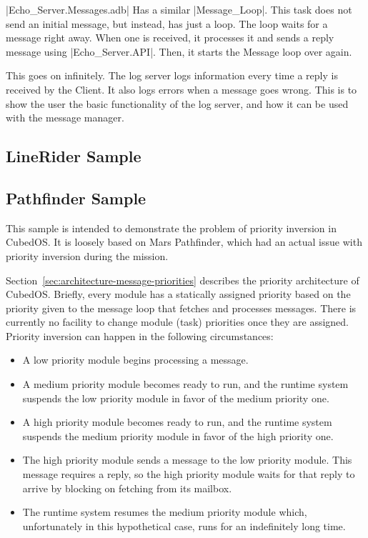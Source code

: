 |Echo_Server.Messages.adb| Has a similar |Message_Loop|. This task does not send an initial
message, but instead, has just a loop. The loop waits for a message right away. When one is
received, it processes it and sends a reply message using |Echo_Server.API|. Then, it starts the
Message loop over again.

This goes on infinitely. The log server logs information every time a reply is received by the
Client. It also logs errors when a message goes wrong. This is to show the user the basic
functionality of the log server, and how it can be used with the message manager.


\subsection{LineRider Sample}
\label{sec:manual-linerider-sample}



\subsection{Pathfinder Sample}
\label{sec:manual-pathfinder-sample}

This sample is intended to demonstrate the problem of priority inversion in CubedOS. It is
loosely based on Mars Pathfinder, which had an actual issue with priority inversion during the
mission.

Section~\ref{sec:architecture-message-priorities} describes the priority architecture of
CubedOS. Briefly, every module has a statically assigned priority based on the priority given to
the message loop that fetches and processes messages. There is currently no facility to change
module (task) priorities once they are assigned. Priority inversion can happen in the following
circumstances:

\begin{itemize}

\item A low priority module begins processing a message.

\item A medium priority module becomes ready to run, and the runtime system suspends the low
priority module in favor of the medium priority one.

\item A high priority module becomes ready to run, and the runtime system suspends the medium
priority module in favor of the high priority one.

\item The high priority module sends a message to the low priority module. This message requires
a reply, so the high priority module waits for that reply to arrive by blocking on fetching from
its mailbox.

\item The runtime system resumes the medium priority module which, unfortunately in this
hypothetical case, runs for an indefinitely long time.

\end{itemize}

